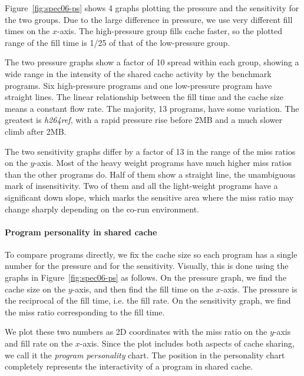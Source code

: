 Figure~\ref{fig:spec06-ps} shows 4 graphs plotting the pressure and the
sensitivity for the two groups.  Due to the large difference in
pressure, we use very different fill times on the $x$-axis.  The
high-pressure group fills cache faster, so the plotted range of the
fill time is 1/25 of that of the low-pressure group.

The two pressure graphs show a factor of 10 spread within each group,
showing a wide range in the intensity of the shared cache activity by
the benchmark programs.  Six high-pressure programs and one
low-pressure program have straight lines.  The linear relationship
between the fill time and the cache size means a constant flow rate.
The majority, 13 programs, have some variation.  The greatest is
\emph{h264ref}, with a rapid pressure rise before 2MB and a much
slower climb after 2MB.

The two sensitivity graphs differ by a factor of 13 in the range of
the miss ratios on the $y$-axis.  Most of the heavy weight programs
have much higher miss ratios than the other programs do.  Half of them
show a straight line, the unambiguous mark of insensitivity.  Two of
them and all the light-weight programs have a significant down slope,
which marks the sensitive area where the miss ratio may change sharply
depending on the co-run environment.  

\paragraph{Program personality in shared cache}

To compare programs directly, we fix the cache size so each program
has a single number for the pressure and for the sensitivity.  Visually,
this is done using the graphs in Figure~\ref{fig:spec06-ps} as follows.
On the pressure graph, we find the cache size on the $y$-axis, and then
find the fill time on the $x$-axis.  The pressure is the reciprocal of 
the fill time, i.e. the fill rate.  On the sensitivity graph, we find
the miss ratio corresponding to the fill time.  

We plot these two numbers as 2D coordinates with the miss ratio on the
$y$-axis and fill rate on the $x$-axis.  Since the plot includes both
aspects of cache sharing, we call it the \emph{program personality}
chart.  The position in the personality chart completely represents
the interactivity of a program in shared cache.


